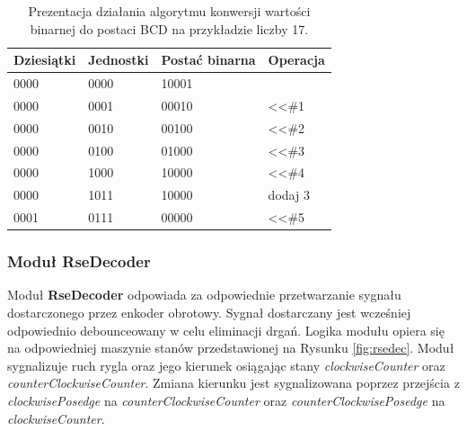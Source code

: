 \documentclass[12pt] {article}
\begin{document}
\begin{table}[H]
\centering
\caption{Prezentacja działania algorytmu konwersji wartości binarnej do postaci BCD na przykładzie liczby 17.}
\begin{tabular}{llll}
\toprule
\rowcolor[HTML]{ECF4FF} 
Dziesiątki                   & Jednostki                    & Postać binarna & Operacja                 \\ \midrule
0000                         & 0000                         & 10001          &                          \\
0000                         & 0001                         & 00010          & \textless{}\textless \#1 \\
0000                         & 0010                         & 00100          & \textless{}\textless \#2 \\
0000                         & 0100                         & 01000          & \textless{}\textless \#3 \\
0000                         & \cellcolor[HTML]{FFFFC7}1000 & 10000          & \textless{}\textless \#4 \\
0000                         & \cellcolor[HTML]{FFFFC7}1011 & 10000          & dodaj 3                  \\
\cellcolor[HTML]{9AFF99}0001 & \cellcolor[HTML]{9AFF99}0111 & 00000          & \textless{}\textless \#5 \\
\bottomrule  
\end{tabular}
\label{table:bcdexample}
\end{table}


\subsubsection{Moduł RseDecoder}
Moduł \textbf{RseDecoder} odpowiada za odpowiednie przetwarzanie sygnału dostarczonego przez enkoder obrotowy. Sygnał dostarczany jest wcześniej odpowiednio debounceowany w celu eliminacji drgań. Logika modułu opiera się na odpowiedniej maszynie stanów przedstawionej na Rysunku \ref{fig:rsedec}. Moduł sygnalizuje ruch rygla oraz jego kierunek osiągając stany \textit{clockwiseCounter} oraz \textit{counterClockwiseCounter}. Zmiana kierunku jest sygnalizowana poprzez przejścia z \textit{clockwisePosedge} na \textit{counterClockwiseCounter} oraz \textit{counterClockwisePosedge} na \textit{clockwiseCounter}.
\end{document}
